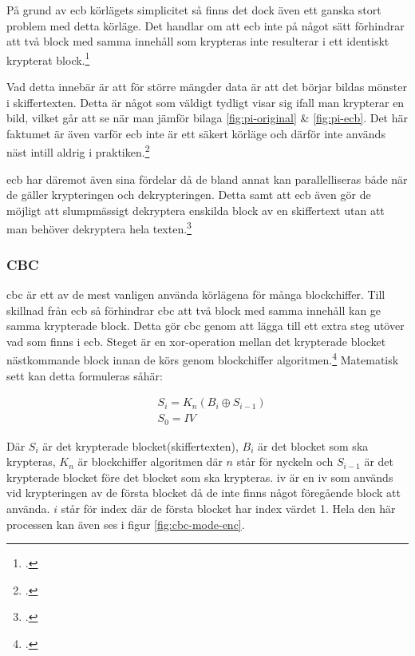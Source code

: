 På grund av \acrshort{ecb} körlägets simplicitet så finns det dock även ett ganska
stort problem med detta körläge. Det handlar om att \acrshort{ecb} inte på något
sätt förhindrar att två block med samma innehåll som krypteras inte resulterar i
ett identiskt krypterat block.\footcite{modesofoperation}

Vad detta innebär är att för större mängder data
är att det börjar bildas mönster i skiffertexten. Detta är något som väldigt
tydligt visar sig ifall man krypterar en bild, vilket går att se när man jämför
bilaga \ref{fig:pi-original} \& \ref{fig:pi-ecb}.
Det här faktumet är även varför \acrshort{ecb} inte är ett säkert körläge
och därför inte används näst intill aldrig i praktiken.\footcite{modesofoperation}

\acrshort{ecb} har däremot även sina fördelar då de bland annat kan parallelliseras
både när de gäller krypteringen och dekrypteringen. Detta samt att \acrshort{ecb}
även gör de möjligt att slumpmässigt dekryptera enskilda block av en skiffertext
utan att man behöver dekryptera hela texten.\footcite{modesofoperation}

\subsubsection{CBC}
\acrlong{cbc} är ett av de mest vanligen använda körlägena för många blockchiffer.
Till skillnad från \acrshort{ecb} så förhindrar \acrshort{cbc} att två block med
samma innehåll kan ge samma krypterade block. Detta gör \acrshort{cbc} genom att
lägga till ett extra steg utöver vad som finns i \acrshort{ecb}. Steget
är en \gls{xor}-operation mellan det krypterade blocket nästkommande block innan
de körs genom blockchiffer algoritmen.\footcite{modesofoperation}
Matematisk sett kan detta formuleras såhär:

\begin{equation}
    \label{eq:cbc-encryption}
    \begin{aligned}
        &S_i = K_n(B_i \oplus S_{i-1})\\\nonumber
        &S_0 = IV
    \end{aligned}
\end{equation}

Där $S_i$ är det krypterade blocket(skiffertexten), $B_i$ är det blocket som ska krypteras,
$K_n$ är blockchiffer algoritmen där $n$ står för nyckeln och $S_{i-1}$ är
det krypterade blocket före det blocket som ska krypteras. \acrshort{iv} är en
\acrfull{iv} som används vid krypteringen av de första blocket då de inte finns
något föregående block att använda. $i$ står för index där de första blocket har
index värdet 1. Hela den här processen kan även ses i figur \ref{fig:cbc-mode-enc}.

